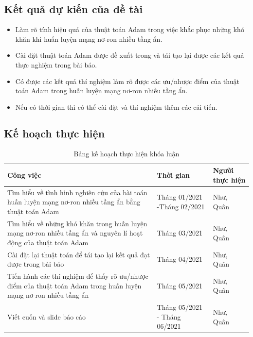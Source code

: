 \documentclass{article}[14pt]
\begin{document}
{    \subsection{Kết quả dự kiến của đề tài}
        
    \begin{itemize}
        \item Làm rõ tính hiệu quả của thuật toán Adam trong việc khắc phục những khó khăn khi huấn luyện mạng nơ-ron nhiều tầng ẩn.
        \item Cài đặt thuật toán Adam được đề xuất trong  \cite{Kingma2015AdamAM} và tái tạo lại được các kết quả thực nghiệm trong bài báo.
        \item Có được các kết quả thí nghiệm làm rõ được các ưu/nhược điểm của thuật toán Adam trong huấn luyện mạng nơ-ron nhiều tầng ẩn.
        \item Nếu có thời gian thì có thể cài đặt và thí nghiệm thêm các cải tiến.
    \end{itemize}
    
    \subsection{Kế hoạch thực hiện}
    
    \begin{table}[H]
    \Large
    \begin{tabular}{ |p{8.5cm}|p{3.75cm}|p{3.75cm}| } 
     \hline
     \textbf{Công việc} & \textbf{Thời gian} & \textbf{Người thực hiện} \\ 
     \hline
     Tìm hiểu về tình hình nghiên cứu của bài toán huấn luyện mạng nơ-ron nhiều tầng ẩn bằng thuật toán Adam & Tháng 01/2021 -Tháng 02/2021 & Như, Quân \\ 
     \hline
     Tìm hiểu về những khó khăn trong huấn luyện mạng nơ-ron nhiều tầng ẩn và nguyên lí hoạt động của thuật toán Adam & Tháng 03/2021 & Như, Quân \\ 
     \hline
     Cài đặt lại thuật toán để tái tạo lại kết quả đạt được trong bài báo & Tháng 04/2021 & Như, Quân \\ 
     \hline
     Tiến hành các thí nghiệm để thấy rõ ưu/nhược điểm của thuật toán Adam trong huấn luyện mạng nơ-ron nhiều tầng ẩn & Tháng 05/2021 & Như, Quân \\ 
     \hline
     Viết cuốn và slide báo cáo & Tháng 05/2021 - Tháng 06/2021 & Như, Quân \\ 
     \hline
    \end{tabular}
    \caption{\label{tab:table-name}Bảng kế hoạch thực hiện khóa luận}
    \end{table}
    
    }
    
\end{document}
